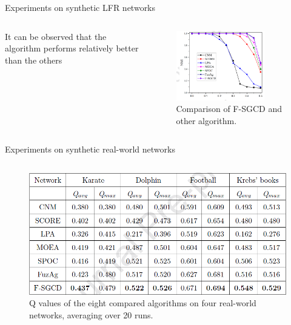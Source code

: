 \documentclass[aspectratio=169,xcolor=dvipsnames]{beamer}
\begin{document}
\begin{frame}{Experiments on synthetic LFR networks}
    \begin{columns}
        \begin{column}{0.5\textwidth}
                It can be observed that the algorithm performs relatively better than the others
        \end{column}
        \begin{column}{0.5\textwidth}
            \begin{figure}
            \centering
                \includegraphics[width=0.8\textwidth]{synthetic-LFR.PNG}
                \caption{Comparison of F-SGCD and other algorithm.}
            \end{figure}
        \end{column}
    \end{columns}
\end{frame}


\begin{frame}{Experiments on synthetic real-world networks}
    \begin{columns}
        \begin{column}{0.5\textwidth}
            \begin{figure}
            \centering
                \includegraphics[width=1\textwidth]{synthetic-realworld.PNG}
                \caption{Q values of the eight compared algorithms on four real-world networks, averaging
                over 20 runs.}
            \end{figure}
        \end{column}
    \end{columns}
\end{frame}
\end{document}
